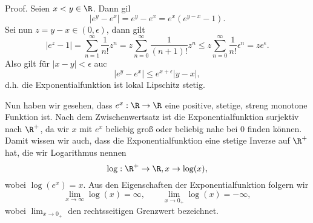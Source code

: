 \documentclass[letterpaper,10pt,english]{jupyterBook}
\begin{document}
\begin{emphBox}{}{}
Proof.  Seien \(x  < y \in \R\). Dann gil
\begin{equation*}
 \left\vert e^y - e^x \right\vert = e^y - e^x = e^x ( e^{y-x} - 1).
\end{equation*}
Sei nun \(z=y-x \in (0,\epsilon)\), dann gilt
\begin{equation*}
  \left\vert e^z -  1 \right\vert = \sum_{n=1}^\infty \frac{1}{n!} z^n = z \sum_{n=0}^\infty \frac{1}{(n+1)!} z^n  \leq z \sum_{n=0}^\infty \frac{1}{n!} \epsilon^n = z e^\epsilon.
\end{equation*}
Also gilt für \(|x-y| < \epsilon\) auc
\begin{equation*}
  \left\vert e^y - e^x \right\vert \leq e^{x+\epsilon} |y-x|,
\end{equation*}
d.h. die Exponentialfunktion ist lokal Lipschitz stetig.
\end{emphBox}

Nun haben wir gesehen, dass \(e^x: \R \rightarrow \R\) eine positive, stetige, streng monotone Funktion ist. Nach dem Zwischenwertsatz ist die Exponentialfunktion surjektiv nach \(\R^+\), da wir \(x\) mit \(e^x\) beliebig groß oder beliebig nahe bei \(0\) finden können. Damit wissen wir auch, dass die Exponentialfunktion eine stetige Inverse auf \(\R^+\) hat, die wir Logarithmus nennen
\begin{equation*}
 \log: \R^+ \rightarrow \R, x \rightarrow \log(x),
\end{equation*}
wobei \(\log(e^x) =x\). Aus den Eigenschaften der Exponentialfunktion folgern wir
\begin{equation*}
 \lim_{x\rightarrow \infty} \log(x) = \infty, \qquad \lim_{x\rightarrow 0_+} \log(x) = -\infty,
\end{equation*}
wobei \(\lim_{x\rightarrow 0_+}\) den rechtsseitigen Grenzwert bezeichnet.
\end{document}
